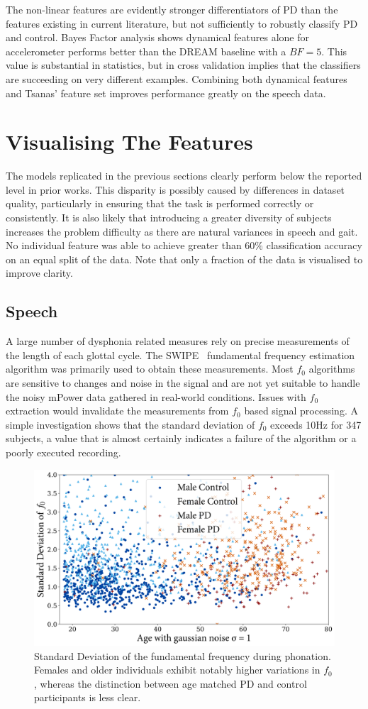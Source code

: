 \documentclass[12pt, twoside]{book}
\begin{document}
The non-linear features are evidently stronger differentiators of PD than the features existing in current literature, but not sufficiently to robustly classify PD and control. Bayes Factor analysis shows dynamical features alone for accelerometer performs better than the DREAM baseline with a $BF=5$. This value is substantial in statistics, but in cross validation implies that the classifiers are succeeding on very different examples. Combining both dynamical features and Tsanas' feature set improves performance greatly on the speech data.

\section{Visualising The Features}
The models replicated in the previous sections clearly perform below the reported level in prior works. This disparity is possibly caused by differences in dataset quality, particularly in ensuring that the task is performed correctly or consistently. It is also likely that introducing a greater diversity of subjects increases the problem difficulty as there are natural variances in speech and gait. No individual feature was able to achieve greater than 60\% classification accuracy on an equal split of the data. Note that only a fraction of the data is visualised to improve clarity. 

\subsection{Speech}
A large number of dysphonia related measures rely on precise measurements of the length of each glottal cycle. The SWIPE~\cite{camacho2007swipe} fundamental frequency estimation algorithm was primarily used to obtain these measurements. Most $f_0$ algorithms are sensitive to changes and noise in the signal and are not yet suitable to handle the noisy mPower data gathered in real-world conditions. Issues with $f_0$ extraction would invalidate the measurements from $f_0$ based signal processing. A simple investigation shows that the standard deviation of $f_0$ exceeds 10Hz for 347 subjects, a value that is almost certainly indicates a failure of the algorithm or a poorly executed recording.

\begin{figure}[h]
	\caption{Standard Deviation of the fundamental frequency during phonation. Females and older individuals exhibit notably higher variations in $f_0$, whereas the distinction between age matched PD and control participants is less clear.}
	\label{stdevf0}
	\centering\includegraphics[width=0.75\linewidth]{f0stdev.png}
\end{figure}
\end{document}
